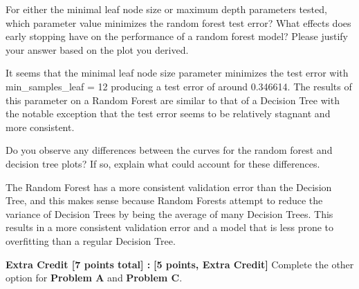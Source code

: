 \problem[6]
For either the minimal leaf node size or maximum depth parameters tested, which parameter value minimizes the random forest test error? What effects does early stopping have on the performance of a random forest model?
Please justify your answer based on the plot you derived.

\begin{solution}
    It seems that the minimal leaf node size parameter minimizes the test error with min_samples_leaf = 12 producing a test error of around 0.346614. The results of this parameter on a Random Forest are similar to that of a Decision Tree with the notable exception that the test error seems to be relatively stagnant and more consistent.
\end{solution}

\problem[4]
Do you observe any differences between the curves for the random forest and decision tree plots? If so, explain what could account for these differences.

\begin{solution}
    The Random Forest has a more consistent validation error than the Decision Tree, and this makes sense because Random Forests attempt to reduce the variance of Decision Trees by being the average of many Decision Trees. This results in a more consistent validation error and a model that is less prone to overfitting than a regular Decision Tree.
\end{solution}

\textbf{Extra Credit [7 points total] :} \problem\textbf{[5 points, Extra Credit]} Complete the other option for \textbf{Problem A }and \textbf{Problem C}.


